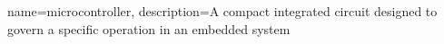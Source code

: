 \renewcommand{\glsnamefont}[1]{\makefirstuc{#1}}
{
    name=microcontroller,
    description={A compact integrated circuit designed to govern a specific operation in an embedded system}
}